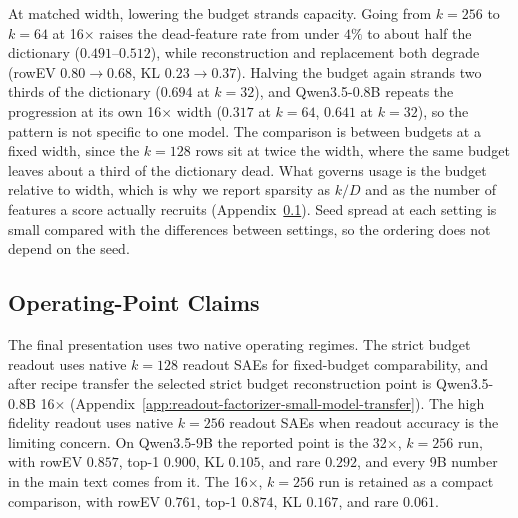 At matched width, lowering the budget strands capacity. Going from $k=256$ to $k=64$ at
16$\times$ raises the dead-feature rate from under $4\%$ to about half
the dictionary ($0.491$--$0.512$), while reconstruction and replacement
both degrade (rowEV $0.80\rightarrow0.68$, KL
$0.23\rightarrow0.37$). Halving the budget again strands two thirds of
the dictionary ($0.694$ at $k=32$), and Qwen3.5-0.8B repeats the
progression at its own 16$\times$ width ($0.317$ at $k=64$, $0.641$ at
$k=32$), so the pattern is not specific to one model.
The comparison is between budgets at a fixed
width, since the $k=128$ rows sit at twice the width, where the same budget
leaves about a third of the dictionary dead. What governs usage is the
budget relative to width, which is why we report
sparsity as $k/D$ and as the number of features a score actually
recruits (Appendix~\ref{app:readout-factorizer-operating-point-claims}). Seed
spread at each setting is small compared with the differences between
settings, so the ordering does not depend on the seed.

\ReadoutSAEFloatBarrier
\subsection{Operating-Point Claims}
\label{app:readout-factorizer-operating-point-claims}

The final presentation uses two native operating regimes. The
strict budget readout uses native $k=128$ readout SAEs for fixed-budget
comparability, and after recipe transfer the selected strict budget reconstruction
point is Qwen3.5-0.8B 16$\times$
(Appendix~\ref{app:readout-factorizer-small-model-transfer}). The
high fidelity readout uses native $k=256$ readout SAEs when readout
accuracy is the limiting concern. On Qwen3.5-9B the reported point is the
32$\times$, $k=256$ run, with rowEV $0.857$, top-1 $0.900$, KL $0.105$, and
rare $0.292$, and every 9B number in the main text comes from it. The
16$\times$, $k=256$ run is retained as a compact comparison, with rowEV
$0.761$, top-1 $0.874$, KL $0.167$, and rare $0.061$.

